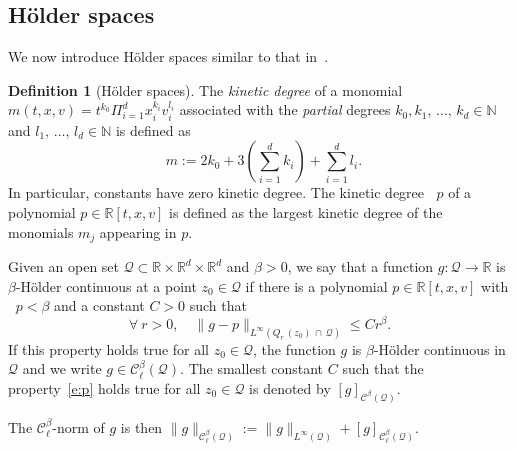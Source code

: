 \documentclass[10pt]{amsart}
\theoremstyle{definition}\newtheorem{defi}[theo]{Definition}\newtheorem{rema}[theo]{Remark}\newtheorem{exam}[theo]{Example}\newtheorem{exem}[theo]{Example}\newtheorem{nota}[theo]{Notation}
\DeclareMathOperator{\degkin}{deg_{\, kin}}
\newcommand{\N}{\mathbb{N}}
\newcommand{\R}{\mathbb{R}}
\newcommand{\cC}{\mathcal{C}}
\newcommand{\cQ}{\mathcal{Q}}
\let\oldforall\forall
\renewcommand*{\forall}{\mathrel{\oldforall}}
\begin{document}
\subsection{H\"older spaces}

We now introduce H\"older spaces similar to that in~\cite{imbert2018schauder}.
\begin{defi}[H\"older spaces]\label{def:holder}
The \emph{kinetic degree} of a monomial $m (t,x,v) = t^{k_0} \Pi_{i=1}^d x_i^{k_i} v_i^{l_i}$ associated with the \emph{partial} degrees $k_0,k_1,\,\dots,\,k_d \in \N$ and $l_1,\,\dots,\,l_d \in \N$ is defined as
\[
\degkin m := 2 k_0 + 3 \left(\sum_{i=1}^d k_i\right) + \sum_{i=1}^d l_i.
\]
In particular, constants have zero kinetic degree. The kinetic degree $\degkin p$ of a polynomial $p \in \R[t,x,v]$ is defined as the largest kinetic degree of the monomials $m_j$ appearing in $p$.

Given an open set $\cQ \subset \R \times \R^d \times \R^d$ and $\beta >0$, we say that a function $g: \cQ \to \R$ is $\beta$-H\"older continuous at a point $z_0 \in \cQ$ if there is a polynomial $p \in \R [t,x,v]$ with $\degkin p < \beta$ and a constant $C>0$ such that
\begin{equation}\label{e:p}
\forall \ r >0, \quad \|g- p\|_{L^\infty\left(Q_r\,(z_0)\,\cap\,\cQ\right)} \le C r^{\beta}.
\end{equation}
If this property holds true for all $z_0 \in \cQ$, the function $g$ is $\beta$-H\"older continuous in $\cQ$ and we write $g \in \cC_\ell^\beta (\cQ)$. The smallest constant $C$ such that the property~\eqref{e:p} holds true for all $z_0 \in \cQ$ is denoted by $[g]_{\cC^{\beta}(\cQ)}$.

The $\cC_\ell^{\beta}$-norm of $g$ is then $\|g\|_{\cC_\ell^{\beta}(\cQ)} := \|g\|_{L^\infty(\cQ)} + [g]_{\cC_\ell^{\beta}(\cQ)}$.
\end{defi}
\goodbreak
\end{document}
